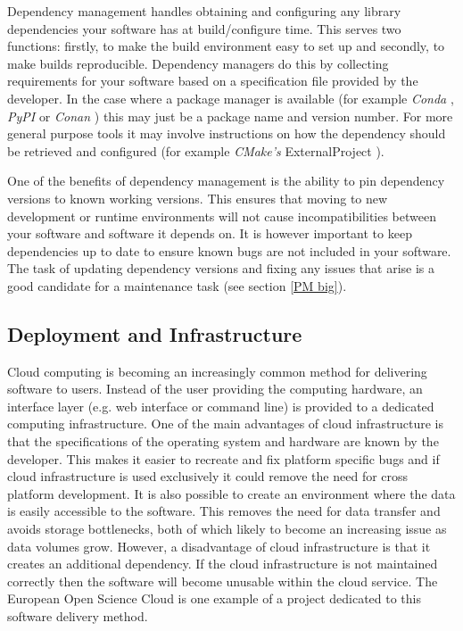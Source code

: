 \documentclass[jnr]{iosart2x}
\begin{document}
Dependency management handles obtaining and configuring any library dependencies your software has at build/configure time.
This serves two functions: firstly, to make the build environment easy to set up and secondly, to make builds reproducible.
Dependency managers do this by collecting requirements for your software based on a specification file provided by the developer.
In the case where a package manager is available (for example {\it Conda} \cite{Conda}, {\it PyPI} \cite{PyPI} or {\it Conan} \cite{Conan}) this may just be a package name and version number.
For more general purpose tools it may involve instructions on how the dependency should be retrieved and configured (for example {\it CMake's} ExternalProject \cite{CMake_ExternalProject}).

One of the benefits of dependency management is the ability to pin dependency versions to known working versions.
This ensures that moving to new development or runtime environments will not cause incompatibilities between your software and software it depends on.
It is however important to keep dependencies up to date to ensure known bugs are not included in your software.
The task of updating dependency versions and fixing any issues that arise is a good candidate for a maintenance task (see section \ref{PM big}).

\subsection{Deployment and Infrastructure}
\label{Infrastructure}

Cloud computing is becoming an increasingly common method for delivering software to users.
Instead of the user providing the computing hardware, an interface layer (e.g. web interface or command line) is provided to a dedicated computing infrastructure.
One of the main advantages of cloud infrastructure is that the specifications of the operating system and hardware are known by the developer.
This makes it easier to recreate and fix platform specific bugs and if cloud infrastructure is used exclusively it could remove the need for cross platform development.
It is also possible to create an environment where the data is easily accessible to the software.
This removes the need for data transfer and avoids storage bottlenecks, both of which likely to become an increasing issue as data volumes grow.
However, a disadvantage of cloud infrastructure is that it creates an additional dependency.
If the cloud infrastructure is not maintained correctly then the software will become unusable within the cloud service.
The European Open Science Cloud \cite{EOSC} is one example of a project dedicated to this software delivery method.
\end{document}
